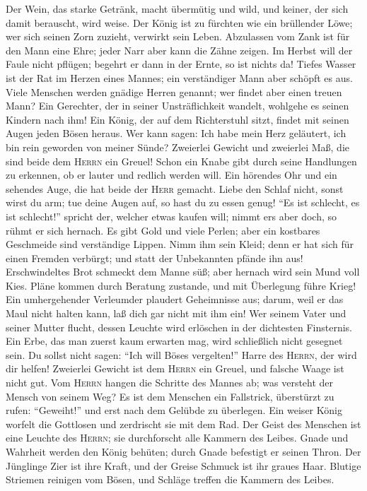  Der Wein, das starke Getränk, macht übermütig und wild,
und keiner, der sich damit berauscht, wird weise.  Der
König ist zu fürchten wie ein brüllender Löwe; wer sich seinen Zorn
zuzieht, verwirkt sein Leben.  Abzulassen vom Zank ist für
den Mann eine Ehre; jeder Narr aber kann die Zähne zeigen.
 Im Herbst will der Faule nicht pflügen; begehrt er dann
in der Ernte, so ist nichts da!  Tiefes Wasser ist der Rat
im Herzen eines Mannes; ein verständiger Mann aber schöpft es aus.
 Viele Menschen werden gnädige Herren genannt; wer findet
aber einen treuen Mann?  Ein Gerechter, der in seiner
Unsträflichkeit wandelt, wohlgehe es seinen Kindern nach ihm!
 Ein König, der auf dem Richterstuhl sitzt, findet mit
seinen Augen jeden Bösen heraus.  Wer kann sagen: Ich habe
mein Herz geläutert, ich bin rein geworden von meiner Sünde?
 Zweierlei Gewicht und zweierlei Maß, die sind beide dem
\textsc{Herrn} ein Greuel!  Schon ein Knabe gibt durch
seine Handlungen zu erkennen, ob er lauter und redlich werden will.
 Ein hörendes Ohr und ein sehendes Auge, die hat beide
der \textsc{Herr} gemacht.  Liebe den Schlaf nicht, sonst
wirst du arm; tue deine Augen auf, so hast du zu essen genug!
 ``Es ist schlecht, es ist schlecht!'' spricht der,
welcher etwas kaufen will; nimmt er\textquotesingle s aber doch, so
rühmt er sich hernach.  Es gibt Gold und viele Perlen;
aber ein kostbares Geschmeide sind verständige Lippen. 
Nimm ihm sein Kleid; denn er hat sich für einen Fremden verbürgt; und
statt der Unbekannten pfände ihn aus!  Erschwindeltes
Brot schmeckt dem Manne süß; aber hernach wird sein Mund voll Kies.
 Pläne kommen durch Beratung zustande, und mit Überlegung
führe Krieg!  Ein umhergehender Verleumder plaudert
Geheimnisse aus; darum, weil er das Maul nicht halten kann, laß dich gar
nicht mit ihm ein!  Wer seinem Vater und seiner Mutter
flucht, dessen Leuchte wird erlöschen in der dichtesten Finsternis.
 Ein Erbe, das man zuerst kaum erwarten mag, wird
schließlich nicht gesegnet sein.  Du sollst nicht sagen:
``Ich will Böses vergelten!'' Harre des \textsc{Herrn}, der wird dir
helfen!  Zweierlei Gewicht ist dem \textsc{Herrn} ein
Greuel, und falsche Waage ist nicht gut.  Vom
\textsc{Herrn} hangen die Schritte des Mannes ab; was versteht der
Mensch von seinem Weg?  Es ist dem Menschen ein
Fallstrick, überstürzt zu rufen: ``Geweiht!'' und erst nach dem Gelübde
zu überlegen.  Ein weiser König worfelt die Gottlosen und
zerdrischt sie mit dem Rad.  Der Geist des Menschen ist
eine Leuchte des \textsc{Herrn}; sie durchforscht alle Kammern des
Leibes.  Gnade und Wahrheit werden den König behüten;
durch Gnade befestigt er seinen Thron.  Der Jünglinge
Zier ist ihre Kraft, und der Greise Schmuck ist ihr graues Haar.
 Blutige Striemen reinigen vom Bösen, und Schläge treffen
die Kammern des Leibes.

